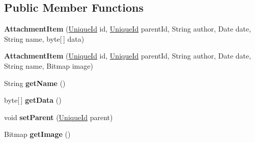\subsection*{Public Member Functions}
\begin{DoxyCompactItemize}
\item 
\hypertarget{classcom_1_1ualberta_1_1team17_1_1_attachment_item_ab01c18fd1671c8821416e8327fb329ee}{{\bfseries Attachment\+Item} (\hyperlink{classcom_1_1ualberta_1_1team17_1_1_unique_id}{Unique\+Id} id, \hyperlink{classcom_1_1ualberta_1_1team17_1_1_unique_id}{Unique\+Id} parent\+Id, String author, Date date, String name, byte\mbox{[}$\,$\mbox{]} data)}\label{classcom_1_1ualberta_1_1team17_1_1_attachment_item_ab01c18fd1671c8821416e8327fb329ee}

\item 
\hypertarget{classcom_1_1ualberta_1_1team17_1_1_attachment_item_a8b05960ae7091a81c106281d05a5b1f4}{{\bfseries Attachment\+Item} (\hyperlink{classcom_1_1ualberta_1_1team17_1_1_unique_id}{Unique\+Id} id, \hyperlink{classcom_1_1ualberta_1_1team17_1_1_unique_id}{Unique\+Id} parent\+Id, String author, Date date, String name, Bitmap image)}\label{classcom_1_1ualberta_1_1team17_1_1_attachment_item_a8b05960ae7091a81c106281d05a5b1f4}

\item 
\hypertarget{classcom_1_1ualberta_1_1team17_1_1_attachment_item_ac534b25a4ba46f7205aa2d968eb55744}{String {\bfseries get\+Name} ()}\label{classcom_1_1ualberta_1_1team17_1_1_attachment_item_ac534b25a4ba46f7205aa2d968eb55744}

\item 
\hypertarget{classcom_1_1ualberta_1_1team17_1_1_attachment_item_ad5ac032b3287f8fef28f41a41eb4cb85}{byte\mbox{[}$\,$\mbox{]} {\bfseries get\+Data} ()}\label{classcom_1_1ualberta_1_1team17_1_1_attachment_item_ad5ac032b3287f8fef28f41a41eb4cb85}

\item 
\hypertarget{classcom_1_1ualberta_1_1team17_1_1_attachment_item_a83798585a33dcbd6d0bbcb37767b21d4}{void {\bfseries set\+Parent} (\hyperlink{classcom_1_1ualberta_1_1team17_1_1_unique_id}{Unique\+Id} parent)}\label{classcom_1_1ualberta_1_1team17_1_1_attachment_item_a83798585a33dcbd6d0bbcb37767b21d4}

\item 
\hypertarget{classcom_1_1ualberta_1_1team17_1_1_attachment_item_a240df8af84dfeb0986563aff4970f224}{Bitmap {\bfseries get\+Image} ()}\label{classcom_1_1ualberta_1_1team17_1_1_attachment_item_a240df8af84dfeb0986563aff4970f224}

\end{DoxyCompactItemize}
